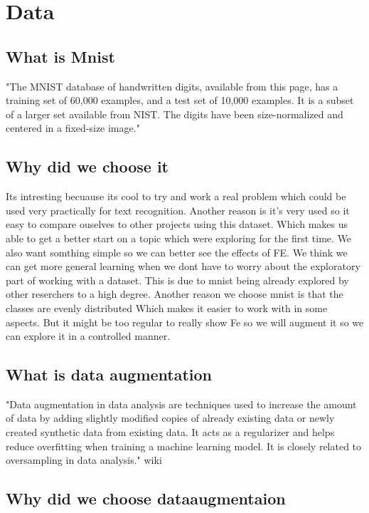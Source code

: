 \section{Data}

\subsection{What is Mnist}

"The MNIST database of handwritten digits, available from this page, has a training set of 60,000 examples, and a test set of 10,000 examples. It is a subset of a larger set available from NIST. The digits have been size-normalized and centered in a fixed-size image."


\subsection{Why did we choose it}

Its intresting becuause its cool to try and work a real problem which could be used very practically for text recognition. Another reason is it's very used so it easy to compare ouselves to other projects using this dataset. Which makes us able to get a better start on a topic which were exploring for the first time. We also want somthing simple so we can better see the effects of FE. We think we can get more general learning when we dont have to worry about the exploratory part of working with a dataset. This is due to mnist being already explored by other reserchers to a high degree. Another reason we choose mnist is that the classes are evenly distributed Which makes it easier to work with in some aspects. But it might be too regular to really show Fe so we will augment it so we can explore it in a controlled manner.


\subsection{What is data augmentation}

"Data augmentation in data analysis are techniques used to increase the amount of data by adding slightly modified copies of already existing data or newly created synthetic data from existing data. It acts as a regularizer and helps reduce overfitting when training a machine learning model. It is closely related to oversampling in data analysis." wiki


\subsection{Why did we choose dataaugmentaion}

